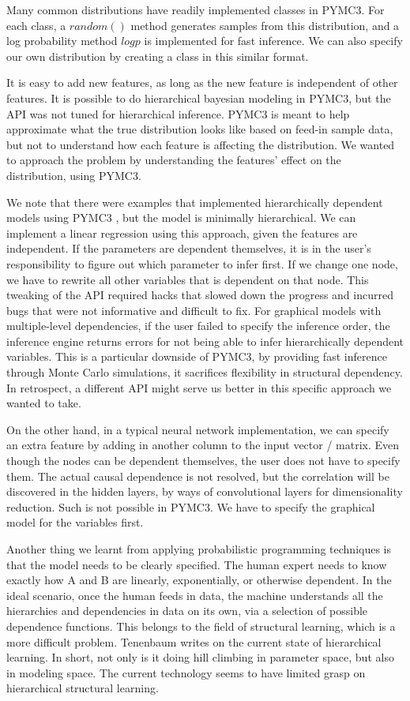 \documentclass[]{article}
\begin{document}
Many common distributions have readily implemented classes in PYMC3. For each class, a $random()$ method generates samples from this distribution, and a log probability method $logp$ is implemented for fast inference. We can also specify our own distribution by creating a class in this similar format.


It is easy to add new features, as long as the new feature is independent of other features. It is possible to do hierarchical bayesian modeling in PYMC3, but the API was not tuned for hierarchical inference. PYMC3 is meant to help approximate what the true distribution looks like based on feed-in sample data, but not to understand how each feature is affecting the distribution. We wanted to approach the problem by understanding the features' effect on the distribution, using PYMC3. 

We note that there were examples that implemented hierarchically dependent models using PYMC3 \cite{twiecki2}, but the model is minimally hierarchical. We can implement a linear regression using this approach, given the features are independent. If the parameters are dependent themselves, it is in the user's responsibility to figure out which parameter to infer first. If we change one node, we have to rewrite all other variables that is dependent on that node. This tweaking of the API required hacks that slowed down the progress and incurred bugs that were not informative and difficult to fix. For graphical models with multiple-level dependencies, if the user failed to specify the inference order, the inference engine returns errors for not being able to infer hierarchically dependent variables. This is a particular downside of PYMC3, by providing fast inference through Monte Carlo simulations, it sacrifices flexibility in structural dependency. In retrospect, a different API might serve us better in this specific approach we wanted to take. 

On the other hand, in a typical neural network implementation, we can specify an extra feature by adding in another column to the input vector / matrix. Even though the nodes can be dependent themselves, the user does not have to specify them. The actual causal dependence is not resolved, but the correlation will be discovered in the hidden layers, by ways of convolutional layers for dimensionality reduction. Such is not possible in PYMC3. We have to specify the graphical model for the variables first.

Another thing we learnt from applying probabilistic programming techniques is that the model needs to be clearly specified. The human expert needs to know exactly how A and B are linearly, exponentially, or otherwise dependent. In the ideal scenario, once the human feeds in data, the machine understands all the hierarchies and dependencies in data on its own, via a selection of possible dependence functions. This belongs to the field of structural learning, which is a more difficult problem. Tenenbaum \cite{tenenbaum} writes on the current state of hierarchical learning. In short, not only is it doing hill climbing in parameter space, but also in modeling space. The current technology seems to have limited grasp on hierarchical structural learning. 
\end{document}
